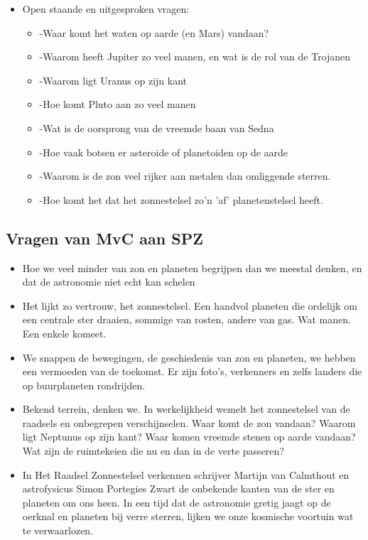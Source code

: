 \documentclass[11pt,fleqn]{book} %
\begin{document}
\begin{itemize}
\item Open staande en uitgesproken vragen:
  \begin{itemize}
  \item -Waar komt het waten op aarde (en Mars) vandaan?
  \item -Waarom heeft Jupiter zo veel manen, en wat is de rol van de Trojanen
  \item -Waarom ligt Uranus op zijn kant
  \item -Hoe komt Pluto aan zo veel manen
  \item -Wat is de oorsprong van de vreemde baan van Sedna
  \item -Hoe vaak botsen er asteroide of planetoiden op de aarde
  \item -Waarom is de zon veel rijker aan metalen dan omliggende sterren.
  \item -Hoe komt het dat het zonnestelsel zo'n 'af' planetenstelsel heeft.
  \end{itemize}
\end{itemize}

\subsection{Vragen van MvC aan SPZ}

\begin{itemize}
  \item Hoe we veel minder van zon en planeten begrijpen dan we meestal denken, en dat de astronomie niet echt kan schelen

  \item   Het lijkt zo vertrouw, het zonnestelsel. Een handvol planeten die ordelijk om een centrale ster draaien, sommige van rosten, andere van gas. Wat manen. Een enkele komeet.

  \item   We snappen de bewegingen, de geschiedenis van zon en planeten, we hebben een vermoeden van de toekomst. Er zijn foto’s, verkenners en zelfs landers die op buurplaneten rondrijden.

  \item   Bekend terrein, denken we. In werkelijkheid wemelt het zonnestelsel van de raadsels en onbegrepen verschijnselen. Waar komt de zon vandaan? Waarom ligt Neptunus op zijn kant? Waar komen vreemde stenen op aarde vandaan? Wat zijn de ruimtekeien die nu en dan in de verte passeren?

  \item   In Het Raadsel Zonnestelsel verkennen schrijver Martijn van Calmthout en astrofysicus Simon Portegies Zwart de onbekende kanten van de ster en planeten om ons heen. In een tijd dat de astronomie gretig jaagt op de oerknal en planeten bij verre sterren, lijken we onze kosmische voortuin wat te verwaarlozen.
\end{itemize}
  
\end{document}
